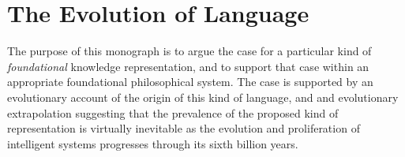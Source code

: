 \section{The Evolution of Language}

The purpose of this monograph is to argue the case for a particular kind of \emph{foundational} knowledge representation, and to support that case within an appropriate foundational philosophical system.
The case is supported by an evolutionary account of the origin of this kind of language, and and evolutionary extrapolation suggesting that the prevalence of the proposed kind of representation is virtually inevitable as the evolution and proliferation of intelligent systems progresses through its sixth billion years.

